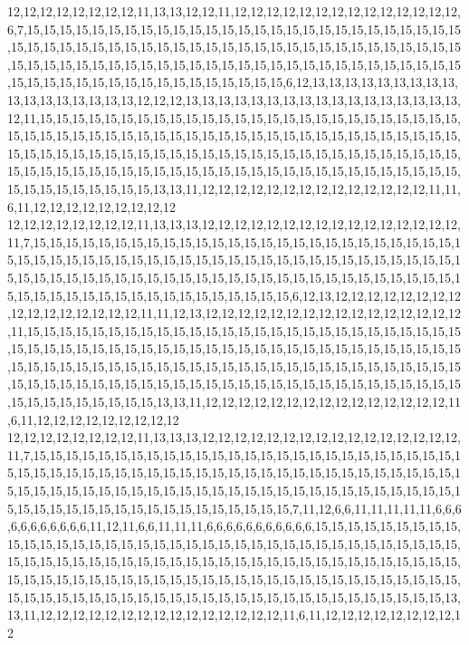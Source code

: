 12,12,12,12,12,12,12,12,11,13,13,12,12,11,12,12,12,12,12,12,12,12,12,12,12,12,12,12,6,7,15,15,15,15,15,15,15,15,15,15,15,15,15,15,15,15,15,15,15,15,15,15,15,15,15,15,15,15,15,15,15,15,15,15,15,15,15,15,15,15,15,15,15,15,15,15,15,15,15,15,15,15,15,15,15,15,15,15,15,15,15,15,15,15,15,15,15,15,15,15,15,15,15,15,15,15,15,15,15,15,15,15,15,15,15,15,15,15,15,15,15,15,15,15,15,15,15,15,15,15,6,12,13,13,13,13,13,13,13,13,13,13,13,13,13,13,13,13,13,12,12,12,13,13,13,13,13,13,13,13,13,13,13,13,13,13,13,13,13,12,11,15,15,15,15,15,15,15,15,15,15,15,15,15,15,15,15,15,15,15,15,15,15,15,15,15,15,15,15,15,15,15,15,15,15,15,15,15,15,15,15,15,15,15,15,15,15,15,15,15,15,15,15,15,15,15,15,15,15,15,15,15,15,15,15,15,15,15,15,15,15,15,15,15,15,15,15,15,15,15,15,15,15,15,15,15,15,15,15,15,15,15,15,15,15,15,15,15,15,15,15,15,15,15,15,15,15,15,15,15,15,15,15,15,15,15,15,15,15,15,13,13,11,12,12,12,12,12,12,12,12,12,12,12,12,12,12,11,11,6,11,12,12,12,12,12,12,12,12,12
12,12,12,12,12,12,12,12,11,13,13,13,12,12,12,12,12,12,12,12,12,12,12,12,12,12,12,12,11,7,15,15,15,15,15,15,15,15,15,15,15,15,15,15,15,15,15,15,15,15,15,15,15,15,15,15,15,15,15,15,15,15,15,15,15,15,15,15,15,15,15,15,15,15,15,15,15,15,15,15,15,15,15,15,15,15,15,15,15,15,15,15,15,15,15,15,15,15,15,15,15,15,15,15,15,15,15,15,15,15,15,15,15,15,15,15,15,15,15,15,15,15,15,15,15,15,15,15,15,15,6,12,13,12,12,12,12,12,12,12,12,12,12,12,12,12,12,12,12,11,11,12,13,12,12,12,12,12,12,12,12,12,12,12,12,12,12,12,12,11,15,15,15,15,15,15,15,15,15,15,15,15,15,15,15,15,15,15,15,15,15,15,15,15,15,15,15,15,15,15,15,15,15,15,15,15,15,15,15,15,15,15,15,15,15,15,15,15,15,15,15,15,15,15,15,15,15,15,15,15,15,15,15,15,15,15,15,15,15,15,15,15,15,15,15,15,15,15,15,15,15,15,15,15,15,15,15,15,15,15,15,15,15,15,15,15,15,15,15,15,15,15,15,15,15,15,15,15,15,15,15,15,15,15,15,15,15,15,15,15,13,13,11,12,12,12,12,12,12,12,12,12,12,12,12,12,12,12,11,6,11,12,12,12,12,12,12,12,12,12
12,12,12,12,12,12,12,12,11,13,13,13,12,12,12,12,12,12,12,12,12,12,12,12,12,12,12,12,11,7,15,15,15,15,15,15,15,15,15,15,15,15,15,15,15,15,15,15,15,15,15,15,15,15,15,15,15,15,15,15,15,15,15,15,15,15,15,15,15,15,15,15,15,15,15,15,15,15,15,15,15,15,15,15,15,15,15,15,15,15,15,15,15,15,15,15,15,15,15,15,15,15,15,15,15,15,15,15,15,15,15,15,15,15,15,15,15,15,15,15,15,15,15,15,15,15,15,15,15,15,7,11,12,6,6,11,11,11,11,11,6,6,6,6,6,6,6,6,6,6,6,11,12,11,6,6,11,11,11,6,6,6,6,6,6,6,6,6,6,6,15,15,15,15,15,15,15,15,15,15,15,15,15,15,15,15,15,15,15,15,15,15,15,15,15,15,15,15,15,15,15,15,15,15,15,15,15,15,15,15,15,15,15,15,15,15,15,15,15,15,15,15,15,15,15,15,15,15,15,15,15,15,15,15,15,15,15,15,15,15,15,15,15,15,15,15,15,15,15,15,15,15,15,15,15,15,15,15,15,15,15,15,15,15,15,15,15,15,15,15,15,15,15,15,15,15,15,15,15,15,15,15,15,15,15,15,15,15,15,15,13,13,11,12,12,12,12,12,12,12,12,12,12,12,12,12,12,12,11,6,11,12,12,12,12,12,12,12,12,12
